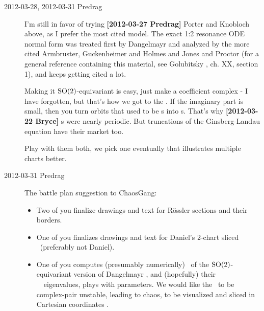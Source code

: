 \begin{description}
\item[2012-03-28, 2012-03-31 Predrag] I'm still in favor of trying {\bf
[2012-03-27 Predrag]} Porter and Knobloch above, as I prefer
the most cited model. The exact 1:2 resonance ODE normal form was
treated first by  Dangelmayr and analyzed by the more cited
Armbruster, Guckenheimer and Holmes and Jones and
Proctor (for a  general reference containing this material,
see Golubitsky \etal{}, ch. XX, section 1), and keeps getting
cited a lot.

Making it $\textrm{SO}(2)$-equivariant is easy, just make a coefficient complex
- I have forgotten, but that's how we got to the \cLe. If the imaginary
part is small, then you turn orbits that used to be \po s into \rpo s.
That's why {\bf [2012-03-22 Bryce]} \rpo s were nearly periodic. But
truncations of the Ginsberg-Landau equation have their market too.

Play with them both, we pick one eventually that illustrates multiple
charts better.

\item[2012-03-31 Predrag] The battle plan suggestion to ChaosGang:
\begin{itemize}
  \item
        Two of you finalize drawings and text for R\"ossler sections and
        their borders.
  \item
        One of you finalizes drawings and text for Daniel's 2-chart
        sliced \cLe\ (preferably not Daniel).
  \item
        One of you computes (presumably numerically) \reqva\ of the
        $\textrm{SO}(2)$-equivariant version of Dangelmayr {\twoMode}
        , and (hopefully) their \stabmat\ \Mvar\
        eigenvalues, plays with parameters. We would like the \reqva\ to
        be complex-pair unstable, leading to chaos, to be visualized and
        sliced in Cartesian coordinates \refeq{eq:AGH}.
\end{itemize}


\end{description}
